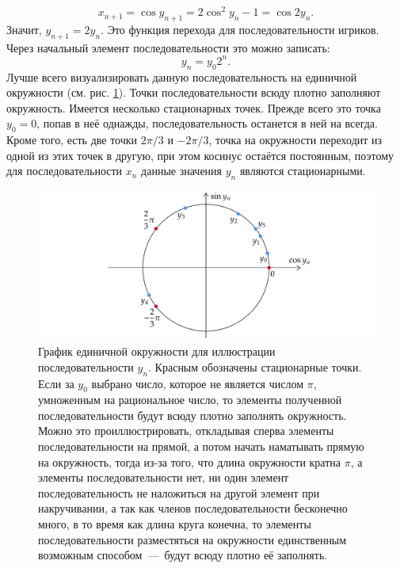 \documentclass[12pt]{article}
\begin{document}
\begin{equation}
    x_{n+1} = \cos{y_{n+1}} = 2 \cos^2{y_n} - 1 = \cos{2y_n}.
\end{equation}
Значит, $y_{n+1} = 2y_n$. Это функция перехода для последовательности игриков. Через начальный элемент последовательности это можно записать:
\begin{equation}
    y_n = y_0 2^n.
\end{equation}
Лучше всего визуализировать данную последовательность на единичной окружности (см. рис. \ref{fig:11}). Точки последовательности всюду плотно заполняют окружность. Имеется несколько стационарных точек. Прежде всего это точка $y_0 = 0$, попав в неё однажды, последовательность останется в ней на всегда. Кроме того, есть две точки $2\pi/3$ и $-2\pi/3$, точка на окружности переходит из одной из этих точек в другую, при этом косинус остаётся постоянным, поэтому для последовательности $x_n$ данные значения $y_n$ являются стационарными.
\begin{figure}[ht]
    \centering
    \includegraphics[width = 1\textwidth]{fig11.png}
    \caption{График единичной окружности для иллюстрации последовательности $y_n$. Красным обозначены стационарные точки. Если за $y_0$ выбрано число, которое не является числом $\pi$, умноженным на рациональное число, то элементы полученной последовательности будут всюду плотно заполнять окружность. Можно это проиллюстрировать, откладывая сперва элементы последовательности на прямой, а потом начать наматывать прямую на окружность, тогда из\--за того, что длина окружности кратна $\pi$, а элементы последовательности нет, ни один элемент последовательность не наложиться на другой элемент при накручивании, а так как членов последовательности бесконечно много, в то время как длина круга конечна, то элементы последовательности разместяться на окружности единственным возможным способом~\----~будут всюду плотно её заполнять.}
    \label{fig:11}
\end{figure}
\par
\end{document}
